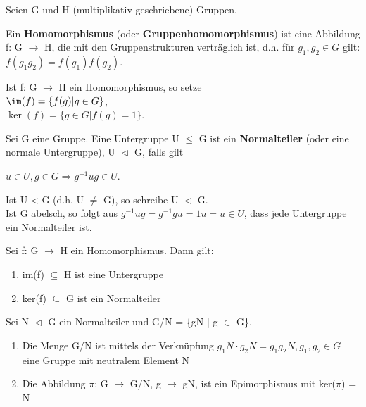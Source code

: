 \begin{definition}
Seien G und H (multiplikativ geschriebene) Gruppen.
\begin{compactenum}
\item Ein \textbf{Homomorphismus} (oder \textbf{Gruppenhomomorphismus}) ist eine Abbildung f: G $\to$ H, die mit den Gruppenstrukturen verträglich ist, d.h. für $g_1, g_2 \in G$ gilt:\\
$f(g_1g_2) = f(g_1) f(g_2)$.
\item Ist f: G $\to$ H ein Homomorphismus, so setze\\
$\im(f) = \{f(g) | g \in G\}$,\\
$\ker(f) = \{g \in G | f(g) = 1\}$.
\end{compactenum}
\end{definition}

\begin{definition}
Sei G eine Gruppe. Eine Untergruppe U $\le$ G ist ein \textbf{Normalteiler} (oder eine normale Untergruppe), U $\vartriangleleft$ G, falls gilt
\begin{center}
$u \in U, g \in G \Rightarrow g^{-1}ug \in U$.
\end{center}
Ist U < G (d.h. U $\neq$ G), so schreibe U $\vartriangleleft$ G.\\
Ist G abelsch, so folgt aus $g^{-1}ug = g^{-1}gu = 1u = u \in U$, dass jede Untergruppe ein Normalteiler ist.
\end{definition}

\begin{lemma}
Sei f: G $\to$ H ein Homomorphismus. Dann gilt:
\begin{enumerate}
\item im(f) $\subseteq$ H ist eine Untergruppe
\item ker(f) $\subseteq$ G ist ein Normalteiler
\end{enumerate}
\end{lemma}

\begin{lemma}
Sei N $\vartriangleleft$ G ein Normalteiler und G/N = \{gN | g $\in$ G\}.
\begin{enumerate}
\item Die Menge G/N ist mittels der Verknüpfung $g_1N \cdot g_2N = g_1g_2N, g_1,g_2 \in G$ eine Gruppe mit neutralem Element N
\item Die Abbildung $\pi$: G $\to$ G/N, g $\mapsto$ gN, ist ein Epimorphismus mit ker($\pi$) = N
\end{enumerate}
\end{lemma}

